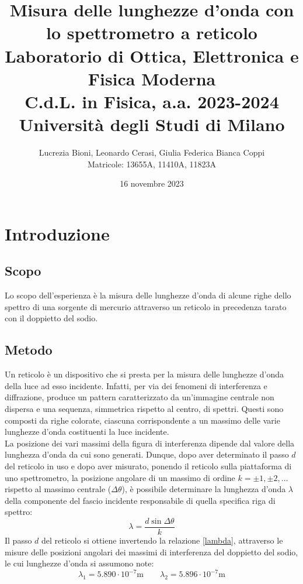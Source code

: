 \documentclass[]{article}
\title{%
    \Huge Misura delle lunghezze d'onda con lo spettrometro a reticolo \\
    \Large Laboratorio di Ottica, Elettronica e Fisica Moderna \\ C.d.L. in Fisica, a.a. 2023-2024 \\ Università degli Studi di Milano}
\author{\LARGE Lucrezia Bioni, Leonardo Cerasi, Giulia Federica Bianca Coppi \\ Matricole: 13655A, 11410A, 11823A}
\date{16 novembre 2023}
\let\oldsection\section%
\renewcommand{\section}{%
	\renewcommand{\theequation}{\thesection.\arabic{equation}}%
	\oldsection}%
\let\oldsubsection\subsection%
\renewcommand{\subsection}{%
	\renewcommand{\theequation}{\thesubsection.\arabic{equation}}%
	\oldsubsection}%
\begin{document}
    \maketitle

    \section{Introduzione}

    \subsection{Scopo}
    Lo scopo dell'esperienza è la misura delle lunghezze d'onda di alcune righe dello spettro di una sorgente di mercurio attraverso un reticolo in precedenza tarato con il doppietto del sodio.

    \subsection{Metodo}
    Un reticolo è un dispositivo che si presta per la misura delle lunghezze d'onda della luce ad esso incidente. Infatti, per via dei fenomeni di interferenza e diffrazione, produce un pattern caratterizzato da un'immagine centrale non dispersa e una sequenza, simmetrica rispetto al centro, di spettri. Questi sono composti da righe colorate, ciascuna corrispondente a un massimo delle varie lunghezze d'onda costituenti la luce incidente. \\
    La posizione dei vari massimi della figura di interferenza dipende dal valore della lunghezza d'onda da cui sono generati. Dunque, dopo aver determinato il passo $d$ del reticolo in uso e dopo aver misurato, ponendo il reticolo sulla piattaforma di uno spettrometro, la posizione angolare di un massimo di ordine $k=\pm 1, \pm 2,\ldots$ rispetto al massimo centrale ($\Delta \theta$), è possibile determinare la lunghezza d'onda $\lambda$ della componente del fascio incidente responsabile di quella specifica riga di spettro:
    \begin{equation}
        \label{lambda}
        \lambda = \frac{d \sin{\Delta\theta}}{k}
    \end{equation}
    Il passo $d$ del reticolo si ottiene invertendo la relazione \ref{lambda}, attraverso le misure delle posizioni angolari dei massimi di interferenza del doppietto del sodio, le cui lunghezze d'onda si assumono note:
    \begin{equation}
        \label{lambda-sodio}
        \lambda_1 = 5.890 \cdot 10^{-7} \text{m} \qquad \lambda_2 = 5.896 \cdot 10^{-7} \text{m}
    \end{equation}
\end{document}
